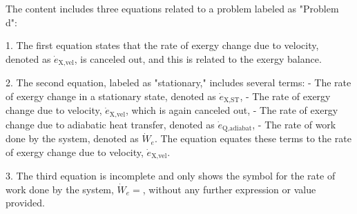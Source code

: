 The content includes three equations related to a problem labeled as "Problem d":

1. The first equation states that the rate of exergy change due to velocity, denoted as \(\dot{e}_{\text{X,vel}}\), is canceled out, and this is related to the exergy balance.

2. The second equation, labeled as "stationary," includes several terms:
   - The rate of exergy change in a stationary state, denoted as \(\dot{e}_{\text{X,ST}}\),
   - The rate of exergy change due to velocity, \(\dot{e}_{\text{X,vel}}\), which is again canceled out,
   - The rate of exergy change due to adiabatic heat transfer, denoted as \(\dot{e}_{\text{Q,adiabat}}\),
   - The rate of work done by the system, denoted as \(\dot{W}_e\).
   The equation equates these terms to the rate of exergy change due to velocity, \(\dot{e}_{\text{X,vel}}\).

3. The third equation is incomplete and only shows the symbol for the rate of work done by the system, \(\dot{W}_e =\), without any further expression or value provided.